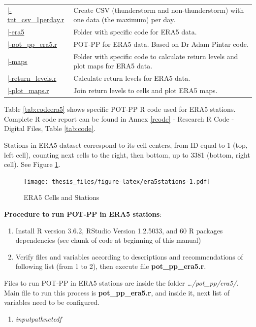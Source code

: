 \documentclass[12pt,oneside]{reedthesis}
\providecommand{\tightlist}{%
  \setlength{\itemsep}{0pt}\setlength{\parskip}{0pt}}
\begin{document}
\begin{longtable}[t]{>{\raggedright\arraybackslash}p{1.3in}>{\raggedright\arraybackslash}p{4.9in}}
\href{ftp://ftp.geocorp.co/windthesis/code/pot_pp/write_t_nt_csv_one_data_per_day.r}{\;\;\;\;|-tnt\_csv\_1perday.r} & Create CSV (thunderstorm and non-thunderstorm) with one data (the maximum) per day.\\
\href{ftp://ftp.geocorp.co/windthesis/code/pot_pp/era5/}{\;\;\;\;|-era5} & Folder with specific code for ERA5 data.\\
\href{ftp://ftp.geocorp.co/windthesis/code/pot_pp/era5/pot_pp_era5.r}{\;\;\;\;\;\;|-pot\_pp\_era5.r} & POT-PP for ERA5 data. Based on Dr Adam Pintar code.\\
\href{ftp://ftp.geocorp.co/windthesis/code/pot_pp/era5/maps/}{\;\;\;\;\;\;|-maps} & Folder with specific code to calculate return levels and plot maps for ERA5 data.\\
\href{ftp://ftp.geocorp.co/windthesis/code/pot_pp/era5/maps/return_levels.r}{\;\;\;\;\;\;\;\;|-return\_levels.r} & Calculate return levels for ERA5 data.\\
\href{ftp://ftp.geocorp.co/windthesis/code/pot_pp/era5/maps/plot_maps.r}{\;\;\;\;\;\;\;\;|-plot\_maps.r} & Join return levels to cells and plot ERA5 maps.\\
\bottomrule
\end{longtable}
\endgroup{}

Table \ref{tab:codeera5} shows specific POT-PP R code used for ERA5 stations. Complete R code report can be found in Annex \ref{rcode} - Research R Code - Digital Files, Table \ref{tab:code}.

Stations in ERA5 dataset correspond to its cell centers, from ID equal to 1 (top, left cell), counting next cells to the right, then bottom, up to 3381 (bottom, right cell). See Figure \ref{fig:era5stations}.
\begin{figure}
\centering
\texttt{[image: thesis\_files/figure-latex/era5stations-1.pdf]}
\caption{\label{fig:era5stations}ERA5 Cells and Stations}
\end{figure}
\textbf{Procedure to run POT-PP in ERA5 stations}:
\begin{enumerate}
\def\labelenumi{\arabic{enumi}.}
\item
  Install R version 3.6.2, RStudio Version 1.2.5033, and 60 R packages dependencies (see chunk of code at beginning of this manual)
\item
  Verify files and variables according to descriptions and recommendations of following list (from 1 to 2), then execute file \textbf{pot\_pp\_era5.r}.
\end{enumerate}
Files to run POT-PP in ERA5 stations are inside the folder \emph{\ldots/pot\_pp/era5/}. Main file to run this process is \textbf{pot\_pp\_era5.r}, and inside it, next list of variables need to be configured.
\begin{enumerate}
\def\labelenumi{\arabic{enumi}.}
\tightlist
\item
  \emph{inputpathnetcdf}
\end{enumerate}
\scriptsize
\end{document}
